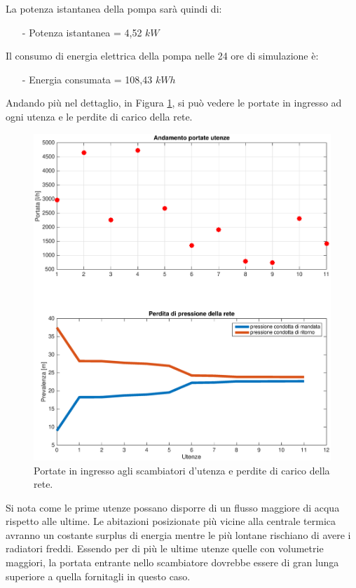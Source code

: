 \documentclass[laurea,oneside,11pt]{USiena_tesiLM3}
\begin{document}
La potenza istantanea della pompa sarà quindi di:
\begin{itemize}
\item[-] Potenza istantanea = 4,52 $kW$
\end{itemize}
Il consumo di energia elettrica della pompa nelle 24 ore di simulazione è:
\begin{itemize}
\item[-] Energia consumata = 108,43 $kWh$
\end{itemize}

Andando più nel dettaglio, in Figura \ref{fig:sim2_noreg}, si può vedere le portate in ingresso ad ogni utenza e le perdite di carico della rete. 

\begin{figure}[!ht]
\centering
\includegraphics[width=\textwidth]{figure/sim2_noreg} 
\caption{Portate in ingresso agli scambiatori d'utenza e perdite di carico della rete. }
\label{fig:sim2_noreg}
\end{figure}

Si nota come le prime utenze possano disporre di un flusso maggiore di acqua rispetto alle ultime. Le abitazioni posizionate più vicine alla centrale termica avranno un costante surplus di energia mentre le più lontane rischiano di avere i radiatori freddi. Essendo per di più le ultime utenze quelle con volumetrie maggiori, la portata entrante nello scambiatore dovrebbe essere di gran lunga superiore a quella fornitagli in questo caso. 
\end{document}
